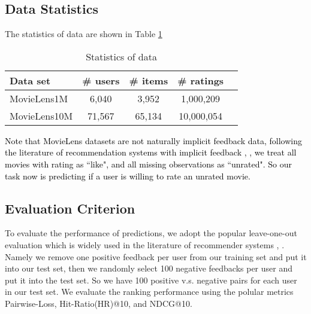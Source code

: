 \documentclass{article}
\numberwithin{equation}{section}
\newcommand{\laks}[1]{\textcolor{black}{#1}}
\newtheorem{sampling strategy}{Sampling Strategy}
\begin{document}

\subsection{Data Statistics}

The statistics of data are shown in Table \ref{tab:data}

\begin{table}[t]
\small
\caption{Statistics of data}
\label{tab:data}
\vskip 0.15in
\begin{center}
\begin{small}
\begin{sc}
\begin{tabular}{lcccr}
\toprule
Data set & \# users & \# items & \# ratings \\
\midrule
MovieLens1M   & 6,040 & 3,952 & 1,000,209 \\
MovieLens10M  & 71,567 & 65,134 & 10,000,054 \\

\bottomrule
\end{tabular}
\end{sc}
\end{small}
\end{center}
\vskip -0.1in
\end{table}

\laks{Note that MovieLens datasets are not naturally implicit feedback data, following the literature of recommendation systems with implicit feedback \cite{bpr}, \cite{neural}, we treat all movies with rating as ``like", and all missing observations as   ``unrated". So our task now is predicting if a user is willing to rate an unrated movie.} 


\subsection{Evaluation Criterion}

To evaluate the performance of predictions, we adopt the popular leave-one-out evaluation which is widely used in the literature of recommender systems \cite{bpr}, \cite{neural}. Namely we remove one positive feedback per user from our training set and put it into our test set, then we randomly select 100 negative feedbacks per user and put it into the test set. So we have 100 positive v.s. negative pairs for each user in our test set. We evaluate the ranking performance using the polular metrics  \textsf{Pairwise-Loss}, \textsf{Hit-Ratio(HR)@10}, and \textsf{NDCG@10}. 
\end{document}
